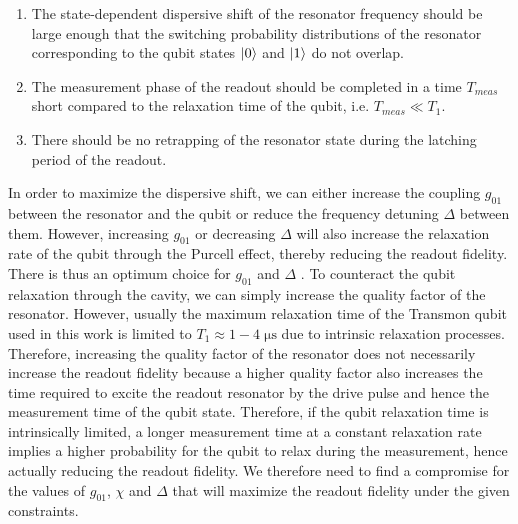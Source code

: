 \begin{enumerate}
\item The state-dependent dispersive shift of the resonator frequency should be large enough that the switching probability distributions of the resonator corresponding to the qubit states $\left| 0 \right>$ and $\left| 1 \right>$ do not overlap.
\item The measurement phase of the readout should be completed in a time $T_{meas}$ short compared to the relaxation time of the qubit, i.e. $T_{meas}\ll T_1$.
\item There should be no retrapping of the resonator state during the latching period of the readout.
\end{enumerate}

In order to maximize the dispersive shift, we can either increase the coupling $g_{01}$ between the resonator and the qubit or reduce the frequency detuning $\Delta$ between them. However, increasing $g_{01}$ or decreasing $\Delta$ will also increase the relaxation rate of the qubit through the Purcell effect, thereby reducing the readout fidelity. There is thus an optimum choice for $g_{01}$ and $\Delta$ \citep{mallet_single-shot_2009}. To counteract the qubit relaxation through the cavity, we can simply increase the quality factor of the resonator. However, usually the maximum relaxation time of the Transmon qubit used in this work is limited to $T_1\approx 1-4\;\mathrm{\mu s}$ due to intrinsic relaxation processes. Therefore, increasing the quality factor of the resonator does not necessarily increase the readout fidelity because a higher quality factor also increases the time required to excite the readout resonator by the drive pulse and hence the measurement time of the qubit state. Therefore, if the qubit relaxation time is intrinsically limited, a longer measurement time at a constant relaxation rate implies a higher probability for the qubit to relax during the measurement, hence actually reducing the readout fidelity. We therefore need to find a compromise for the values of $g_{01}$, $\chi$ and $\Delta$ that will maximize the readout fidelity under the given constraints.

